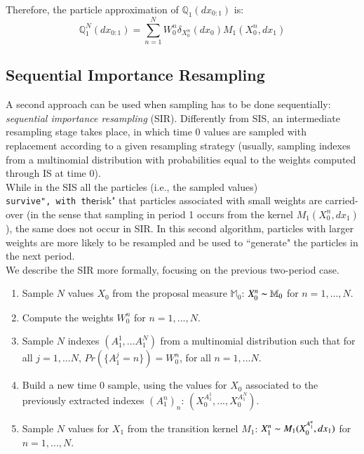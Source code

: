 \documentclass[
]{book}
\theoremstyle{break}
\theoremstyle{nonumberplain}
\begin{document}
Therefore, the particle approximation of \(\mathbb Q_{1}(dx_{0:1})\) is:
\begin{equation*}
      \mathbb Q_{1}^N(dx_{0:1})=\sum_{n=1}^NW_0^n\delta_{X_0^n}(dx_0)M_1(X_0^n,dx_1)
\end{equation*}

\subsection{Sequential Importance Resampling}

A second approach can be used when sampling has to be done sequentially:
\textit{sequential importance resampling} (SIR). Differently from SIS,
an intermediate resampling stage takes place, in which time 0 values are
sampled with replacement according to a given resampling strategy
(usually, sampling indexes from a multinomial distribution with
probabilities equal to the weights computed through IS at time 0).\\
While in the SIS all the particles (i.e., the sampled values)
\texttt{survive",\ with\ the}risk" that particles associated with small
weights are carried-over (in the sense that sampling in period 1 occurs
from the kernel \(M_1(X_0^n,dx_1)\)), the same does not occur in SIR. In
this second algorithm, particles with larger weights are more likely to
be resampled and be used to ``generate" the particles in the next
period.\\
We describe the SIR more formally, focusing on the previous two-period
case.

\begin{enumerate}
    \item Sample $N$ values $X_0$ from the proposal measure $\mathbb M_0$: $X_0^n\thicksim \mathbb M_0$ for $n=1,...,N$.
    \item Compute the weights $W_0^n$ for $n=1,...,N$.
    \item Sample $N$ indexes $(A_1^1,...A_1^N)$ from a multinomial distribution such that for all $j=1,...N$, $Pr(\{A_1^j=n\})=W_0^n$, for all $n=1,...N$.
    \item Build a new time 0 sample, using the values for $X_0$ associated to the previously extracted indexes $(A_1^n)_{n}$: $(X_0^{A_1^1},...,X_0^{A_1^N})$.
    \item Sample $N$ values for $X_1$ from the transition kernel $M_1$: $X_1^n\thicksim M_1(X_0^{A_1^n},dx_1)$ for $n=1,...,N$.
\end{enumerate}
\end{document}
